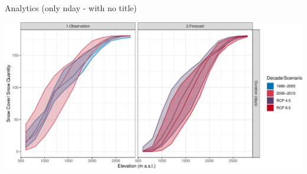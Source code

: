 \documentclass[
  ignorenonframetext,
]{beamer}
\begin{document}
\begin{frame}{Analytics (only nday - with no title)}
\protect\hypertarget{analytics-only-nday---with-no-title}{}
\begin{center}\includegraphics[width=0.9\linewidth]{introduction_presentation_modified_colors_files/figure-beamer/snow-altitude-2-1} \end{center}
\end{frame}
\end{document}
